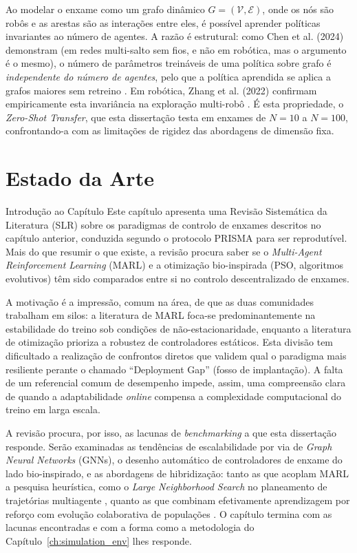 \documentclass[12pt,reqno, twoside]{amsbook}
\makeatletter
\def\section{\@startsection{section}{1}%
      \z@{.5\linespacing\@plus.7\linespacing}{.25\linespacing}%
      {\normalfont\bfseries\flushleft}}
\theoremstyle{plain}
\numberwithin{equation}{chapter}
\numberwithin{section}{chapter}
\numberwithin{table}{chapter}
\numberwithin{figure}{chapter}
\makeatother
\begin{document}
Ao modelar o enxame como um grafo dinâmico $G = (\mathcal{V}, \mathcal{E})$, onde os nós são robôs e as arestas são as interações entre eles, é possível aprender políticas invariantes ao número de agentes. A razão é estrutural: como Chen et al. (2024) demonstram (em redes multi-salto sem fios, e não em robótica, mas o argumento é o mesmo), o número de parâmetros treináveis de uma política sobre grafo é \emph{independente do número de agentes}, pelo que a política aprendida se aplica a grafos maiores sem retreino \cite{chen2024graph}. Em robótica, Zhang et al. (2022) confirmam empiricamente esta invariância na exploração multi-robô \cite{zhang2022h2gnn}. É esta propriedade, o \emph{Zero-Shot Transfer}, que esta dissertação testa em enxames de $N=10$ a $N=100$, confrontando-a com as limitações de rigidez das abordagens de dimensão fixa.

\chapter{Estado da Arte}
\label{ch:sota}

\section{Introdução ao Capítulo}
Este capítulo apresenta uma Revisão Sistemática da Literatura (SLR) sobre os paradigmas de controlo de enxames descritos no capítulo anterior, conduzida segundo o protocolo PRISMA para ser reprodutível. Mais do que resumir o que existe, a revisão procura saber se o \textit{Multi-Agent Reinforcement Learning} (MARL) e a otimização bio-inspirada (PSO, algoritmos evolutivos) têm sido comparados entre si no controlo descentralizado de enxames.

A motivação é a impressão, comum na área, de que as duas comunidades trabalham em silos: a literatura de MARL foca-se predominantemente na estabilidade do treino sob condições de não-estacionaridade, enquanto a literatura de otimização prioriza a robustez de controladores estáticos. Esta divisão tem dificultado a realização de confrontos diretos que validem qual o paradigma mais resiliente perante o chamado ``Deployment Gap'' (fosso de implantação). A falta de um referencial comum de desempenho impede, assim, uma compreensão clara de quando a adaptabilidade \textit{online} compensa a complexidade computacional do treino em larga escala.

A revisão procura, por isso, as lacunas de \textit{benchmarking} a que esta dissertação responde. Serão examinadas as tendências de escalabilidade por via de \textit{Graph Neural Networks} (GNNs), o desenho automático de controladores de enxame do lado bio-inspirado, e as abordagens de hibridização: tanto as que acoplam MARL a pesquisa heurística, como o \textit{Large Neighborhood Search} no planeamento de trajetórias multiagente \cite{wang2025lns2}, quanto as que combinam efetivamente aprendizagem por reforço com evolução colaborativa de populações \cite{li2023race}. O capítulo termina com as lacunas encontradas e com a forma como a metodologia do Capítulo~\ref{ch:simulation_env} lhes responde.
\end{document}
